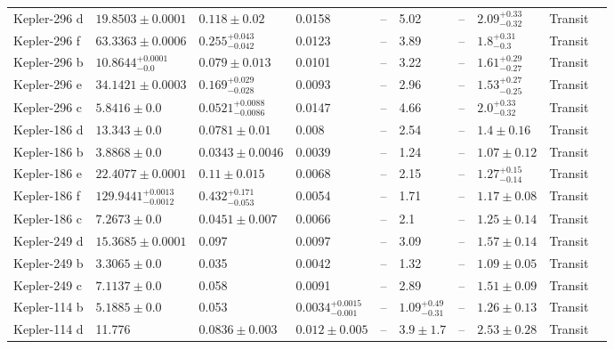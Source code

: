 \begin{tabular}{llllllllll}
Kepler-296 d & $19.8503 \pm 0.0001$ & $0.118 \pm 0.02$ & 0.0158 & -- & 5.02 & -- & $2.09^{+0.33}_{-0.32}$ & Transit & \cite{BARCLAY_ET_AL__2015} \\
Kepler-296 f & $63.3363 \pm 0.0006$ & $0.255^{+0.043}_{-0.042}$ & 0.0123 & -- & 3.89 & -- & $1.8^{+0.31}_{-0.3}$ & Transit & \cite{BARCLAY_ET_AL__2015} \\
Kepler-296 b & $10.8644^{+0.0001}_{-0.0}$ & $0.079 \pm 0.013$ & 0.0101 & -- & 3.22 & -- & $1.61^{+0.29}_{-0.27}$ & Transit & \cite{BARCLAY_ET_AL__2015} \\
Kepler-296 e & $34.1421 \pm 0.0003$ & $0.169^{+0.029}_{-0.028}$ & 0.0093 & -- & 2.96 & -- & $1.53^{+0.27}_{-0.25}$ & Transit & \cite{BARCLAY_ET_AL__2015} \\
Kepler-296 c & $5.8416 \pm 0.0$ & $0.0521^{+0.0088}_{-0.0086}$ & 0.0147 & -- & 4.66 & -- & $2.0^{+0.33}_{-0.32}$ & Transit & \cite{BARCLAY_ET_AL__2015} \\
Kepler-186 d & $13.343 \pm 0.0$ & $0.0781 \pm 0.01$ & 0.008 & -- & 2.54 & -- & $1.4 \pm 0.16$ & Transit & \cite{QUINTANA_ET_AL__2014} \\
Kepler-186 b & $3.8868 \pm 0.0$ & $0.0343 \pm 0.0046$ & 0.0039 & -- & 1.24 & -- & $1.07 \pm 0.12$ & Transit & \cite{QUINTANA_ET_AL__2014} \\
Kepler-186 e & $22.4077 \pm 0.0001$ & $0.11 \pm 0.015$ & 0.0068 & -- & 2.15 & -- & $1.27^{+0.15}_{-0.14}$ & Transit & \cite{QUINTANA_ET_AL__2014} \\
Kepler-186 f & $129.9441^{+0.0013}_{-0.0012}$ & $0.432^{+0.171}_{-0.053}$ & 0.0054 & -- & 1.71 & -- & $1.17 \pm 0.08$ & Transit & \cite{TORRES_ET_AL__2015} \\
Kepler-186 c & $7.2673 \pm 0.0$ & $0.0451 \pm 0.007$ & 0.0066 & -- & 2.1 & -- & $1.25 \pm 0.14$ & Transit & \cite{QUINTANA_ET_AL__2014} \\
Kepler-249 d & $15.3685 \pm 0.0001$ & 0.097 & 0.0097 & -- & 3.09 & -- & $1.57 \pm 0.14$ & Transit & \cite{ROWE_ET_AL__2014} \\
Kepler-249 b & $3.3065 \pm 0.0$ & 0.035 & 0.0042 & -- & 1.32 & -- & $1.09 \pm 0.05$ & Transit & \cite{ROWE_ET_AL__2014} \\
Kepler-249 c & $7.1137 \pm 0.0$ & 0.058 & 0.0091 & -- & 2.89 & -- & $1.51 \pm 0.09$ & Transit & \cite{ROWE_ET_AL__2014} \\
Kepler-114 b & $5.1885 \pm 0.0$ & 0.053 & $0.0034^{+0.0015}_{-0.001}$ & -- & $1.09^{+0.49}_{-0.31}$ & -- & $1.26 \pm 0.13$ & Transit & \cite{ROWE_ET_AL__2014} \\
Kepler-114 d & 11.776 & $0.0836 \pm 0.003$ & $0.012 \pm 0.005$ & -- & $3.9 \pm 1.7$ & -- & $2.53 \pm 0.28$ & Transit & \cite{XIE_2014} \\

\end{tabular}
